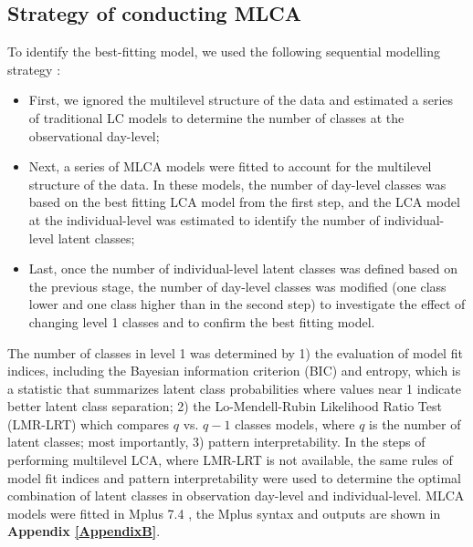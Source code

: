 \subsection{Strategy of conducting MLCA}\vspace{-0.3cm}

To identify the best-fitting model, we used the following sequential modelling strategy \parencite{henry2010multilevel}: 

\begin{itemize}
	\item First, we ignored the multilevel structure of the data and estimated a series of traditional LC models to determine the number of classes at the observational day-level;
	\item Next, a series of MLCA models were fitted to account for the multilevel structure of the data. In these models, the number of day-level classes was based on the best fitting LCA model from the first step, and the LCA model at the individual-level was estimated to identify the number of individual-level latent classes;
	\item Last, once the number of individual-level latent classes was defined based on the previous stage, the number of day-level classes was modified (one class lower and one class higher than in the second step) to investigate the effect of changing level 1 classes and to confirm the best fitting model.
\end{itemize}

The number of classes in level 1 was determined by 1) the evaluation of model fit indices, including the Bayesian information criterion (BIC) and entropy, which is a statistic that summarizes latent class probabilities where values near 1 indicate better latent class separation; 2) the Lo-Mendell-Rubin Likelihood Ratio Test (LMR-LRT) \parencite{lo2001testing, nylund2007deciding} which compares $q$ vs. $q-1$ classes models, where $q$ is the number of latent classes; most importantly, 3) pattern interpretability. In the steps of performing multilevel LCA, where LMR-LRT is not available, the same rules of model fit indices and pattern interpretability were used to determine the optimal combination of latent classes in observation day-level and individual-level. MLCA models were fitted in Mplus 7.4 \parencite{muthen2005mplus}, the Mplus syntax and outputs are shown in \textbf{Appendix \ref{AppendixB}}. \vspace{-0.3cm}



